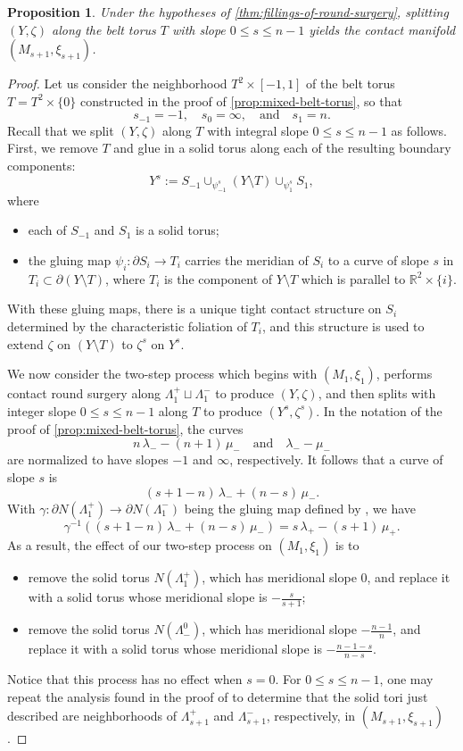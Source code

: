 \documentclass[11pt]{amsart}
\numberwithin{equation}{section}
\theoremstyle{plain}
\newtheorem{prop}[equation]{Proposition}%
\theoremstyle{definition}
\theoremstyle{remark}\newtheorem{rem}[equation]{Remark}%
\theoremstyle{remark}\newtheorem{obs}[equation]{Observation}%
\begin{document}
\begin{prop}\label{prop:splitting-along-belt-torus}
Under the hypotheses of \cref{thm:fillings-of-round-surgery}, splitting $(Y,\zeta)$ along the belt torus $T$ with slope $0\leq s\leq n-1$ yields the contact manifold $(M_{s+1},\xi_{s+1})$.
\end{prop}
\begin{proof}
Let us consider the neighborhood $T^2\times[-1,1]$ of the belt torus $T=T^2\times\{0\}$ constructed in the proof of \cref{prop:mixed-belt-torus}, so that
\[
s_{-1} = -1,
\quad
s_0 = \infty,
\quad\text{and}\quad
s_1 = n.
\]
Recall that we split $(Y,\zeta)$ along $T$ with integral slope $0\leq s\leq n-1$ as follows.  First, we remove $T$ and glue in a solid torus along each of the resulting boundary components:
\[
Y^s := S_{-1} \cup_{\psi^s_{-1}} (Y\setminus T) \cup_{\psi^s_1} S_1,
\]
where
\begin{itemize}
    \item each of $S_{-1}$ and $S_1$ is a solid torus;
    \item the gluing map $\psi_i\colon\partial S_i\to T_i$ carries the meridian of $S_i$ to a curve of slope $s$ in $T_i\subset\partial(Y\setminus T)$, where $T_i$ is the component of $Y\setminus T$ which is parallel to $\mathbb{R}^2\times\{i\}$.
\end{itemize}
With these gluing maps, there is a unique tight contact structure on $S_i$ determined by the characteristic foliation of $T_i$, and this structure is used to extend $\zeta$ on $(Y\setminus T)$ to $\zeta^s$ on $Y^s$.

We now consider the two-step process which begins with $(M_1,\xi_1)$, performs contact round surgery along $\Lambda_1^+\sqcup\Lambda_1^-$ to produce $(Y,\zeta)$, and then splits with integer slope $0\leq s\leq n-1$ along $T$ to produce $(Y^s,\zeta^s)$.  In the notation of the proof of \cref{prop:mixed-belt-torus}, the curves
\[
n\,\lambda_- - (n+1)\,\mu_-
\quad\text{and}\quad
\lambda_--\mu_-
\]
are normalized to have slopes $-1$ and $\infty$, respectively.  It follows that a curve of slope $s$ is
\[
(s+1-n)\,\lambda_- + (n-s)\,\mu_-.
\]
With $\gamma\colon\partial N(\Lambda_1^+)\to\partial N(\Lambda_1^-)$ being the gluing map defined by , we have
\[
\gamma^{-1}((s+1-n)\,\lambda_- + (n-s)\,\mu_-) = s\,\lambda_+ - (s+1)\,\mu_+.
\]
As a result, the effect of our two-step process on $(M_1,\xi_1)$ is to
\begin{itemize}
    \item remove the solid torus $N(\Lambda_1^+)$, which has meridional slope $0$, and replace it with a solid torus whose meridional slope is $-\tfrac{s}{s+1}$;
    \item remove the solid torus $N(\Lambda_-^0)$, which has meridional slope $-\tfrac{n-1}{n}$, and replace it with a solid torus whose meridional slope is $-\tfrac{n-1-s}{n-s}$.
\end{itemize}
Notice that this process has no effect when $s=0$.  For $0\leq s\leq n-1$, one may repeat the analysis found in the proof of  to determine that the solid tori just described are neighborhoods of $\Lambda_{s+1}^+$ and $\Lambda_{s+1}^-$, respectively, in $(M_{s+1},\xi_{s+1})$.
\end{proof}
\end{document}
